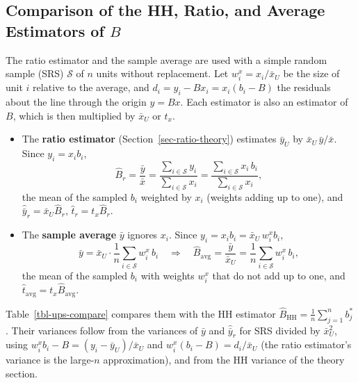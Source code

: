 \documentclass[
  letterpaper,
  DIV=11,
  numbers=noendperiod]{scrreprt}
\renewcommand{\[}{\begin{equation}}
\renewcommand{\]}{\end{equation}}
\begin{document}
\subsection{\texorpdfstring{Comparison of the HH, Ratio, and Average
Estimators of
\(B\)}{Comparison of the HH, Ratio, and Average Estimators of B}}\label{sec-ups-compare}

The ratio estimator and the sample average are used with a simple random
sample (SRS) \(\mathcal{S}\) of \(n\) units without replacement. Let
\(w^x_i=x_i/\bar{x}_U\) be the size of unit \(i\) relative to the
average, and \(d_i=y_i-Bx_i=x_i(b_i-B)\) the residuals about the line
through the origin \(y=Bx\). Each estimator is also an estimator of
\(B\), which is then multiplied by \(\bar{x}_U\) or \(t_x\).

\begin{itemize}
\item
  The \textbf{ratio estimator} (Section~\ref{sec-ratio-theory})
  estimates \(\bar{y}_U\) by \(\bar{x}_U\,\bar{y}/\bar{x}\). Since
  \(y_i=x_ib_i\), \[
  \hat{B}_r=\frac{\bar{y}}{\bar{x}}=\frac{\sum_{i\in\mathcal{S}}y_i}{\sum_{i\in\mathcal{S}}x_i}
  =\frac{\sum_{i\in\mathcal{S}}x_i\,b_i}{\sum_{i\in\mathcal{S}}x_i},
  \] the mean of the sampled \(b_i\) weighted by \(x_i\) (weights adding
  up to one), and \(\hat{\bar{y}}_r=\bar{x}_U\hat{B}_r\),
  \(\hat{t}_r=t_x\hat{B}_r\).
\item
  The \textbf{sample average} \(\bar{y}\) ignores \(x_i\). Since
  \(y_i=x_ib_i=\bar{x}_U\,w^x_ib_i\), \[
  \bar{y}=\bar{x}_U\cdot\frac{1}{n}\sum_{i\in\mathcal{S}}w^x_i\,b_i
  \quad\Longrightarrow\quad
  \hat{B}_{\mathrm{avg}}=\frac{\bar{y}}{\bar{x}_U}=\frac{1}{n}\sum_{i\in\mathcal{S}}w^x_i\,b_i ,
  \] the mean of the sampled \(b_i\) with weights \(w^x_i\) that do not
  add up to one, and
  \(\hat{t}_{\mathrm{avg}}=t_x\hat{B}_{\mathrm{avg}}\).
\end{itemize}

Table~\ref{tbl-ups-compare} compares them with the HH estimator
\(\hat{B}_{\mathrm{HH}}=\frac1n\sum_{j=1}^n b_j^*\). Their variances
follow from the variances of \(\bar{y}\) and \(\hat{\bar{y}}_r\) for SRS
divided by \(\bar{x}_U^2\), using
\(w^x_ib_i-B=(y_i-\bar{y}_U)/\bar{x}_U\) and
\(w^x_i(b_i-B)=d_i/\bar{x}_U\) (the ratio estimator's variance is the
large-\(n\) approximation), and from the HH variance of the theory
section.
\end{document}
